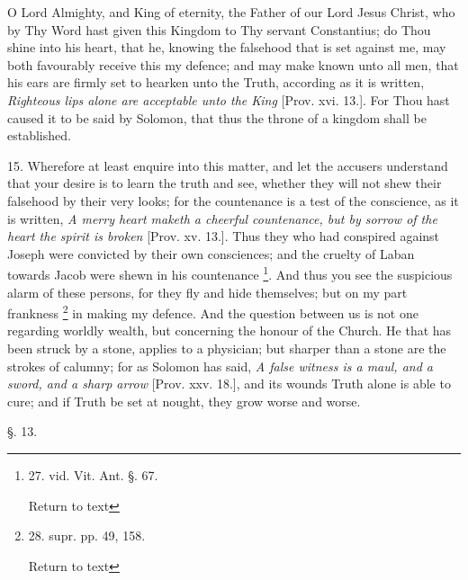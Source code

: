 O Lord Almighty, and King of eternity, the Father of our Lord Jesus
Christ, who by Thy Word hast given this Kingdom to Thy servant
Constantius; do Thou shine into his heart, that he, knowing the
falsehood that is set against me, may both favourably receive this my
defence; and may make known unto all men, that his ears are firmly set
to hearken unto the Truth, according as it is written, \emph{Righteous lips alone are acceptable unto the King}
[Prov. xvi. 13.]. For Thou hast caused it to be said by Solomon, that
thus the throne of a kingdom shall be established.

15. Wherefore at least enquire into this matter, and let the accusers
understand that your desire is to learn the truth and see, whether
they will not shew their falsehood by their very looks; for the
countenance is a test of the conscience, as it is written, \emph{A merry heart maketh a cheerful
countenance, but by sorrow of the heart the spirit is broken}
[Prov. xv. 13.]. Thus they who had conspired against Joseph were
convicted by their own consciences; and the cruelty of Laban towards
Jacob were shewn in his countenance \footnote{27. vid. Vit. Ant. §. 67.

Return to text}. And thus you see the suspicious alarm of these persons, for
they fly and hide themselves; but on my part frankness \footnote{28. supr. pp. 49, 158.

Return to text} in making my defence. And the question between us is not one
regarding worldly wealth, but concerning the honour of the Church. He
that has been struck by a stone, applies to a physician; but sharper
than a stone are the strokes of calumny; for as Solomon has said, \emph{A
false witness is a maul, and a sword, and a sharp arrow} [Prov. xxv. 18.], and its wounds Truth alone is able to cure; and if
Truth be set at nought, they grow worse and worse.

§. 13.

